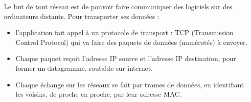 Le but de tout réseau est de pouvoir faire communiquer des logiciels sur des ordinateurs distants. Pour transporter ses données :

\begin{itemize}
	\item l'application fait appel à un protocole de transport : TCP (Transmission Control Protocol) qui va faire des paquets de données (numérotés) à envoyer.
	\item Chaque paquet reçoit l'adresse IP source et l'adresse IP destination,  pour former un datagramme, routable sur internet.
	\item Chaque échange sur les réseaux se fait par trames de données, en identifiant les voisins, de proche en proche, par leur adresse MAC.
\end{itemize}  

